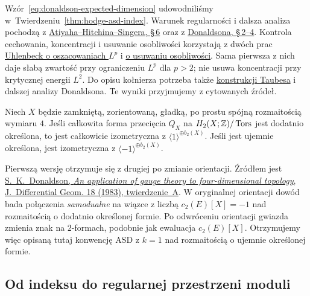 Wzór~\eqref{eq:donaldson-expected-dimension}
udowodniliśmy w~Twierdzeniu~\ref{thm:hodge-asd-index}.
Warunek regularności i dalsza analiza pochodzą z
\href{https://doi.org/10.1098/rspa.1978.0143}
{Atiyaha--Hitchina--Singera, \S\,6} oraz z
\href{https://doi.org/10.1090/S0273-0979-1983-15090-5}
{Donaldsona, \S\,2--4}. Kontrola cechowania,
koncentracji i usuwanie osobliwości korzystają z dwóch prac
\href{https://doi.org/10.1007/BF01947069}
{Uhlenbeck o oszacowaniach $L^p$} i
\href{https://doi.org/10.1007/BF01947068}
{o usuwaniu osobliwości}. Sama pierwsza z nich daje
słabą zwartość przy ograniczeniu $L^p$ dla $p>2$;
nie usuwa koncentracji przy krytycznej energii $L^2$.
Do opisu kołnierza potrzeba także
\href{https://doi.org/10.4310/jdg/1214436701}
{konstrukcji Taubesa} i dalszej analizy Donaldsona.
Te wyniki przyjmujemy z cytowanych źródeł.

\begin{twierdzenie}
\label{thm:donaldson-diagonalizacja}
Niech $X$ będzie zamkniętą, zorientowaną, gładką,
po prostu spójną rozmaitością wymiaru $4$.
Jeśli całkowita forma przecięcia $Q_X$ na
$H_2(X;\mathbb{Z})/\operatorname{Tors}$ jest dodatnio określona,
to jest całkowicie izometryczna z
$\langle1\rangle^{\oplus b_2(X)}$.
Jeśli jest ujemnie określona, jest izometryczna z
$\langle-1\rangle^{\oplus b_2(X)}$.
\end{twierdzenie}

Pierwszą wersję otrzymuje się z drugiej po zmianie
orientacji. Źródłem jest
\href{https://doi.org/10.4310/jdg/1214437665}
{S.~K.~Donaldson, \emph{An application of gauge theory to
four-dimensional topology}, J.~Differential Geom. 18 (1983),
twierdzenie~A}. W oryginalnej orientacji dowód bada
połączenia \emph{samodualne} na wiązce z liczbą
$c_2(E)[X]=-1$ nad rozmaitością o dodatnio określonej
formie. Po odwróceniu orientacji gwiazda zmienia znak
na $2$-formach, podobnie jak ewaluacja $c_2(E)[X]$.
Otrzymujemy więc opisaną tutaj konwencję ASD z $k=1$
nad rozmaitością o ujemnie określonej formie.

\subsection*{Od indeksu do regularnej przestrzeni moduli}


